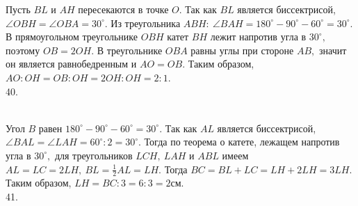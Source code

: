 \documentclass[12pt]{article}
\begin{document}
Пусть $BL$ и $AH$ пересекаются в точке $O.$ Так как $BL$ является биссектрисой, $\angle OBH=\angle OBA=30^\circ.$ Из треугольника $ABH:\ \angle BAH=180^\circ-90^\circ-60^\circ=30^\circ.$ В прямоугольном треугольнике $OBH$ катет $BH$ лежит напротив угла в $30^\circ,$ поэтому $OB=2OH.$ В треугольнике $OBA$ равны углы при стороне $AB,$ значит он является равнобедренным и $AO=OB.$ Таким образом, $AO:OH=OB:OH=2OH:OH=2:1.$\\
40. \begin{figure}[ht!]
\end{figure}\\
Угол $B$ равен $180^\circ-90^\circ-60^\circ=30^\circ.$ Так как $AL$ является биссектрисой, $\angle BAL= \angle LAH=60^\circ:2=30^\circ.$ Тогда по теорема о катете, лежащем напротив угла в $30^\circ,$ для треугольников $LCH,\ LAH$ и $ABL$ имеем $AL=LC=2LH,\ BL=\frac{1}{2}AL=LH.$ Тогда $BC=BL+LC=LH+2LH=3LH.$ Таким образом, $LH=BC:3=6:3=2$см.\\
41. \begin{figure}[ht!]
\end{figure}\\
\end{document}
